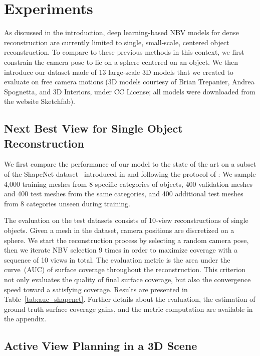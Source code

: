 \section{Experiments}

As discussed in the introduction, deep learning-based NBV models for dense reconstruction are currently limited to single, small-scale, centered object reconstruction. To compare \method to these previous methods in this context, we first constrain the camera pose to lie on a sphere centered on an object. We then introduce our dataset made of 13 large-scale 3D models that we created to evaluate \method on free camera motions (3D models courtesy of Brian Trepanier, Andrea Spognetta, and 3D Interiors, under CC License; all models were downloaded from the website Sketchfab).



\subsection{Next Best View for Single Object Reconstruction}
\label{sec:single_object}

We first compare the performance of our model to the state of the art on a subset of the ShapeNet dataset~\cite{shapenet2015} introduced in \cite{zeng-icirs20-pcnbv} and following the protocol of \cite{zeng-icirs20-pcnbv}: We sample 4,000 training meshes from 8 specific categories of objects, 400 validation meshes and 400 test meshes from the same categories, and 400 additional test meshes from 8 categories unseen during training.

The evaluation on the test datasets consists of  10-view reconstructions of single objects. Given a mesh in the dataset, camera positions are discretized on a sphere. We start the reconstruction process by selecting a random camera pose, then we iterate NBV selection 9 times in order to maximize coverage with a sequence of 10 views in total. The evaluation metric is the area under the curve~(AUC) of surface coverage throughout the reconstruction. This criterion not only evaluates the quality of final surface coverage, but also the convergence speed toward a satisfying coverage. Results are presented in Table~\ref{tab:auc_shapenet}. Further details about the evaluation, the estimation of ground truth surface coverage gains, and the metric computation are available in the appendix.




\subsection{Active View Planning in a 3D Scene}

